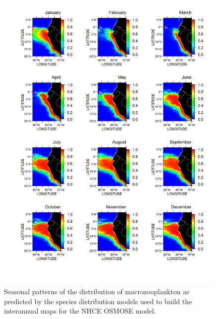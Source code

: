 \begin{figure}
\centering
\includegraphics[height=0.8\textheight]{figures/euphausidos-climatology}
\caption[Seasonal patterns of the distribution of Macrozooplankton]{Seasonal patterns of the distribution of macrozooplankton as predicted by the species distribution models used to build the interannual maps for the NHCE OSMOSE model.}
\label{fig:euphausidos-climatology}
\end{figure}

